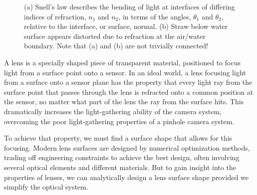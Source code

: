 \begin{figure}
\centerline{
}
\caption{(a) Snell's law describes the bending of light at interfaces of differing indices of refraction, $n_1$ and $n_2$, in terms of the angles, $\theta_1$ and $\theta_2$, relative to the interface, or surface, normal. (b) Straw below water surface appears distorted due to refraction at the air/water boundary. Note that (a) and (b) are not trivially connected!}
\label{fig:snell}
\end{figure}


A lens is a specially shaped piece of transparent material, positioned to focus light from a surface point onto a sensor. In an ideal world, a lens focusing light from a surface onto a sensor plane has the property that every light ray from the surface point that passes through the lens is refracted onto a common position at the sensor, no matter what part of the lens the ray from the surface hits.  This dramatically increases the light-gathering ability of the camera system, overcoming the poor light-gathering properties of a pinhole camera system.

To achieve that property, we must find a surface shape that allows for this focusing.
Modern lens surfaces are designed by numerical optimization methods, trading off engineering constraints to achieve the best design, often involving several optical elements and different materials.  But to gain insight into the properties of lenses, we can analytically design a lens surface shape provided we simplify the optical system.

